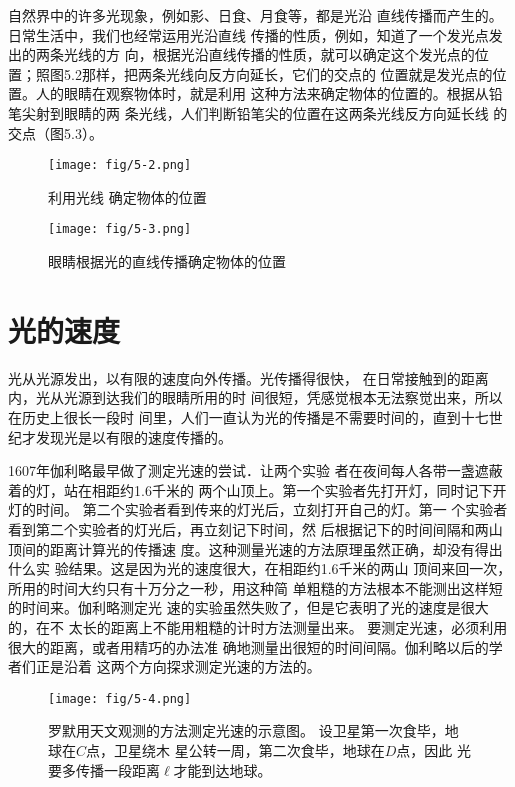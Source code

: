 自然界中的许多光现象，例如影、日食、月食等，都是光沿
直线传播而产生的。日常生活中，我们也经常运用光沿直线
传播的性质，例如，知道了一个发光点发出的两条光线的方
向，根据光沿直线传播的性质，就可以确定这个发光点的位
置；照图5.2那样，把两条光线向反方向延长，它们的交点的
位置就是发光点的位置。人的眼睛在观察物体时，就是利用
这种方法来确定物体的位置的。根据从铅笔尖射到眼睛的两
条光线，人们判断铅笔尖的位置在这两条光线反方向延长线
的交点（图5.3）。
\begin{figure}[htp]
    \centering
    \begin{minipage}[t]{0.48\textwidth}
    \centering
    \texttt{[image: fig/5-2.png]}
    \caption{利用光线
    确定物体的位置}
    \end{minipage}
    \begin{minipage}[t]{0.48\textwidth}
    \centering
    \texttt{[image: fig/5-3.png]}
    \caption{眼睛根据光的直线传播确定物体的位置}
    \end{minipage}
    \end{figure}

\section{光的速度}
光从光源发出，以有限的速度向外传播。光传播得很快，
在日常接触到的距离内，光从光源到达我们的眼睛所用的时
间很短，凭感觉根本无法察觉出来，所以在历史上很长一段时
间里，人们一直认为光的传播是不需要时间的，直到十七世
纪才发现光是以有限的速度传播的。

1607年伽利略最早做了测定光速的尝试．让两个实验
者在夜间每人各带一盏遮蔽着的灯，站在相距约1.6千米的
两个山顶上。第一个实验者先打开灯，同时记下开灯的时间。
第二个实验者看到传来的灯光后，立刻打开自己的灯。第一
个实验者看到第二个实验者的灯光后，再立刻记下时间，然
后根据记下的时间间隔和两山顶间的距离计算光的传播速
度。这种测量光速的方法原理虽然正确，却没有得出什么实
验结果。这是因为光的速度很大，在相距约1.6千米的两山
顶间来回一次，所用的时间大约只有十万分之一秒，用这种简
单粗糙的方法根本不能测出这样短的时间来。伽利略测定光
速的实验虽然失败了，但是它表明了光的速度是很大的，在不
太长的距离上不能用粗糙的计时方法测量出来。
要测定光速，必须利用很大的距离，或者用精巧的办法准
确地测量出很短的时间间隔。伽利略以后的学者们正是沿着
这两个方向探求测定光速的方法的。

\begin{figure}[htp]\centering
    \texttt{[image: fig/5-4.png]}
    \caption{罗默用天文观测的方法测定光速的示意图。
    设卫星第一次食毕，地球在$C$点，卫星绕木
    星公转一周，第二次食毕，地球在$D$点，因此
    光要多传播一段距离$\ell$才能到达地球。}
    \end{figure}

